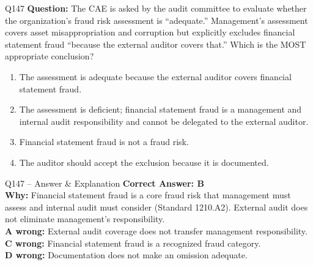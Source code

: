\documentclass[aspectratio=169,10pt]{beamer}
\begin{document}
	\begin{frame}[t]{Q147}
		\small
		\textbf{Question:} The CAE is asked by the audit committee to evaluate whether the organization's fraud risk assessment is ``adequate.'' Management's assessment covers asset misappropriation and corruption but explicitly excludes financial statement fraud ``because the external auditor covers that.'' Which is the MOST appropriate conclusion?
		\begin{enumerate}[label=\Alph*.,itemsep=1pt,topsep=2pt]
			\item The assessment is adequate because the external auditor covers financial statement fraud.
			\item The assessment is deficient; financial statement fraud is a management and internal audit responsibility and cannot be delegated to the external auditor.
			\item Financial statement fraud is not a fraud risk.
			\item The auditor should accept the exclusion because it is documented.
		\end{enumerate}
	\end{frame}
	
	\begin{frame}[t]{Q147 -- Answer \& Explanation}
		\small
		\textbf{Correct Answer: B} \\[4pt]
		\textbf{Why:} Financial statement fraud is a core fraud risk that management must assess and internal audit must consider (Standard 1210.A2). External audit does not eliminate management's responsibility. \\[4pt]
		\textbf{A wrong:} External audit coverage does not transfer management responsibility. \\[2pt]
		\textbf{C wrong:} Financial statement fraud is a recognized fraud category. \\[2pt]
		\textbf{D wrong:} Documentation does not make an omission adequate.
	\end{frame}
	
\end{document}
